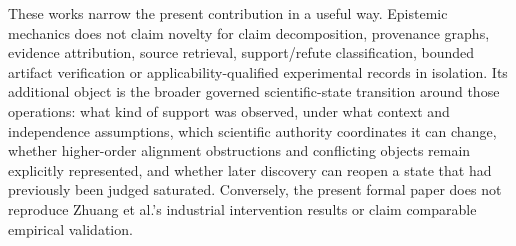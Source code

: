 These works narrow the present contribution in a useful way. Epistemic mechanics does not claim novelty for claim decomposition, provenance graphs, evidence attribution, source retrieval, support/refute classification, bounded artifact verification or applicability-qualified experimental records in isolation. Its additional object is the broader governed scientific-state transition around those operations: what kind of support was observed, under what context and independence assumptions, which scientific authority coordinates it can change, whether higher-order alignment obstructions and conflicting objects remain explicitly represented, and whether later discovery can reopen a state that had previously been judged saturated. Conversely, the present formal paper does not reproduce Zhuang et al.'s industrial intervention results or claim comparable empirical validation.
